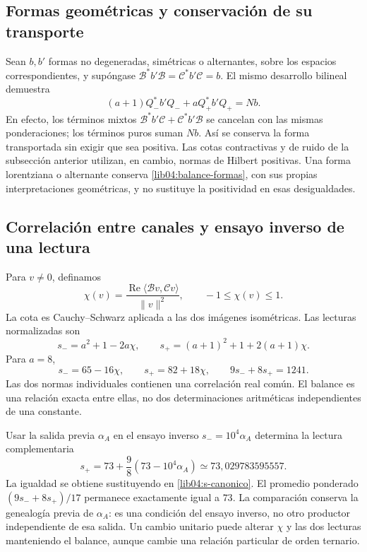 \subsection{Formas geométricas y conservación de su transporte}
\label{lib04:formas}

Sean \(b,b'\) formas no degeneradas, simétricas o alternantes, sobre
los espacios correspondientes, y supóngase
\(\mathcal B^*b'\mathcal B=\mathcal C^*b'\mathcal C=b\).
El mismo desarrollo bilineal demuestra
\begin{equation}
 (a+1)Q_-^*b'Q_-+aQ_+^*b'Q_+=Nb.
 \label{lib04:balance-formas}
\end{equation}
En efecto, los términos mixtos
\(\mathcal B^*b'\mathcal C+\mathcal C^*b'\mathcal B\) se cancelan
con las mismas ponderaciones; los términos puros suman \(Nb\).
Así se conserva la forma transportada sin exigir que sea positiva.
Las cotas contractivas y de ruido de la subsección anterior utilizan,
en cambio, normas de Hilbert positivas. Una forma lorentziana o
alternante conserva \eqref{lib04:balance-formas}, con sus propias
interpretaciones geométricas, y no sustituye la positividad en esas
desigualdades.

\subsection{Correlación entre canales y ensayo inverso de una lectura}
\label{lib04:correlacion}

Para \(v\neq0\), definamos
\begin{equation}
 \chi(v)=\frac{\operatorname{Re}\langle\mathcal Bv,\mathcal Cv\rangle}
                      {\|v\|^2},\qquad -1\leq\chi(v)\leq1.
 \label{lib04:chi}
\end{equation}
La cota es Cauchy--Schwarz aplicada a las dos imágenes isométricas.
Las lecturas normalizadas son
\begin{equation}
 s_-=a^2+1-2a\chi,\qquad
 s_+=(a+1)^2+1+2(a+1)\chi.
 \label{lib04:s-pm}
\end{equation}
Para \(a=8\),
\begin{equation}
 s_-=65-16\chi,\qquad s_+=82+18\chi,\qquad
 9s_-+8s_+=1241.
 \label{lib04:s-canonico}
\end{equation}
Las dos normas individuales contienen una correlación real común. El
balance es una relación exacta entre ellas, no dos determinaciones
aritméticas independientes de una constante.

Usar la salida previa \(\alpha_A\) en el ensayo inverso
\(s_-=10^4\alpha_A\) determina la lectura complementaria
\begin{equation}
 s_+=73+\frac98(73-10^4\alpha_A)
       \simeq73{,}029783595557.
 \label{lib04:ensayo-alpha}
\end{equation}
La igualdad se obtiene sustituyendo en
\eqref{lib04:s-canonico}. El promedio ponderado
\((9s_-+8s_+)/17\) permanece exactamente igual a \(73\).
La comparación conserva la genealogía previa de \(\alpha_A\): es
una condición del ensayo inverso, no otro productor independiente de
esa salida. Un cambio unitario puede alterar \(\chi\) y las dos
lecturas manteniendo el balance, aunque cambie una relación particular
de orden ternario.

